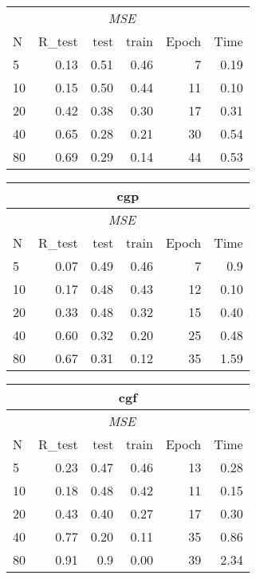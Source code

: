 \documentclass[a4paper, 10pt]{article}
\begin{document}
\begin{table}[h!]
\begin{tabular}{@{}lrrrrr@{}}
      &  & \multicolumn{2}{c}{\emph{MSE}} & & \\
      N  &   R_{test}  &  test & train  &  Epoch  & Time \\
      \midrule
       5  & 0.13    & 0.51    & 0.46    &  7      &  0.19  \\
      10  & 0.15    & 0.50    & 0.44    & 11      &  0.10  \\
      20  & 0.42    & 0.38    & 0.30    & 17      &  0.31  \\
      40  & 0.65    & 0.28    & 0.21    & 30      &  0.54  \\
      80  & 0.69    & 0.29    & 0.14    & 44      &  0.53  \\
      \bottomrule
    \end{tabular} 
    \hfill
    \begin{tabular}{@{}lrrrrr@{}}
      \multicolumn{6}{c}{\textbf{cgp}} \\
      \toprule
      &  & \multicolumn{2}{c}{\emph{MSE}} & & \\
      N  &   R_{test}  &  test & train  &  Epoch  & Time \\
      \midrule
       5  & 0.07    & 0.49    & 0.46    &  7      &  0.9   \\
      10  & 0.17    & 0.48    & 0.43    & 12      &  0.10  \\
      20  & 0.33    & 0.48    & 0.32    & 15      &  0.40  \\
      40  & 0.60    & 0.32    & 0.20    & 25      &  0.48  \\
      80  & 0.67    & 0.31    & 0.12    & 35      &  1.59  \\
      \bottomrule
    \end{tabular} 
    \hfill
    \begin{tabular}{@{}lrrrrr@{}}
      \multicolumn{6}{c}{\textbf{cgf}} \\
      \toprule
      &  & \multicolumn{2}{c}{\emph{MSE}} & & \\
      N  &   R_{test}  &  test & train  &  Epoch  & Time \\
      \midrule
       5  & 0.23    & 0.47   &  0.46    & 13       & 0.28  \\
      10  & 0.18    & 0.48   &  0.42    & 11       & 0.15  \\
      20  & 0.43    & 0.40   &  0.27    & 17       & 0.30  \\
      40  & 0.77    & 0.20   &  0.11    & 35       & 0.86  \\
      80  & 0.91    & 0.9    &  0.00    & 39       & 2.34  \\

\end{tabular}
\end{table}
\end{document}
